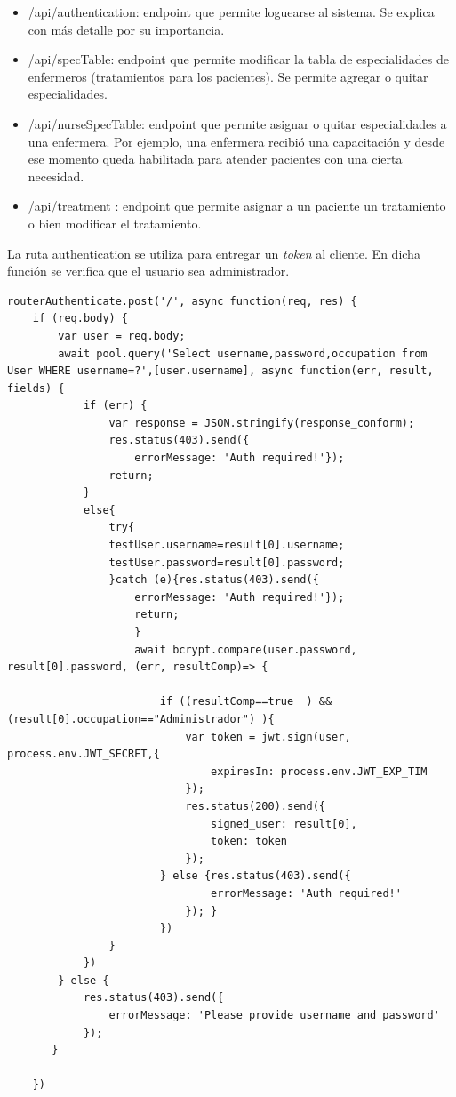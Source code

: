 \begin{itemize}
\item /api/authentication: endpoint que permite loguearse al sistema. Se explica con más detalle por su importancia.
\item /api/specTable: endpoint que permite modificar la tabla de especialidades de enfermeros (tratamientos para los pacientes). Se permite agregar o quitar especialidades.
\item /api/nurseSpecTable: endpoint que permite asignar o quitar especialidades a una enfermera. Por ejemplo, una enfermera recibió una capacitación y desde ese momento queda habilitada para atender pacientes con una cierta necesidad.
\item /api/treatment : endpoint que permite asignar a  un paciente un tratamiento o bien modificar el tratamiento.

\end{itemize}

La ruta authentication se utiliza para entregar un \textit{token} al cliente. En dicha función se verifica que el usuario sea administrador.

\begin{lstlisting}[label=cod:Logueo Web,caption=  Logueo web.]
routerAuthenticate.post('/', async function(req, res) {
    if (req.body) {
        var user = req.body;
        await pool.query('Select username,password,occupation from User WHERE username=?',[user.username], async function(err, result, fields) {
            if (err) {
                var response = JSON.stringify(response_conform);
                res.status(403).send({
                    errorMessage: 'Auth required!'});
                return;    
            }
            else{
                try{
                testUser.username=result[0].username;
                testUser.password=result[0].password;
                }catch (e){res.status(403).send({
                    errorMessage: 'Auth required!'});
                    return;    
                    }
                    await bcrypt.compare(user.password, result[0].password, (err, resultComp)=> {

                        if ((resultComp==true  ) &&(result[0].occupation=="Administrador") ){
                            var token = jwt.sign(user, process.env.JWT_SECRET,{
                                expiresIn: process.env.JWT_EXP_TIM
                            });
                            res.status(200).send({
                                signed_user: result[0],
                                token: token
                            });
                        } else {res.status(403).send({
                                errorMessage: 'Auth required!'
                            }); }
                        })                    
                }      
            }) 
        } else {
            res.status(403).send({
                errorMessage: 'Please provide username and password'
            });
       }

    })

\end{lstlisting}

